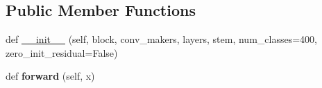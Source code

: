 \subsection*{Public Member Functions}
\begin{DoxyCompactItemize}
\item 
def \hyperlink{classtorchvision_1_1models_1_1video_1_1resnet_1_1VideoResNet_a365c99fb8fa26d93079b16843a6f0c36}{\+\_\+\+\_\+init\+\_\+\+\_\+} (self, block, conv\+\_\+makers, layers, stem, num\+\_\+classes=400, zero\+\_\+init\+\_\+residual=False)
\item 
\mbox{\label{classtorchvision_1_1models_1_1video_1_1resnet_1_1VideoResNet_a3c12a293998e679fc795165f5220565b}} 
def {\bfseries forward} (self, x)
\end{DoxyCompactItemize}
